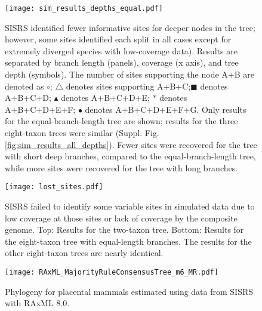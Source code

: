\documentclass[11pt, oneside]{article}   	%
\begin{document}
\begin{figure}[!ht]
\texttt{[image: sim\_results\_depths\_equal.pdf]}
\caption{SISRS identified fewer informative sites for deeper nodes in the tree; however, some sites identified each split in all cases except for extremely diverged species with low-coverage data). 
Results are separated by branch length (panels), coverage (x axis), and tree depth (symbols). 
The number of sites supporting the node A+B are denoted as $\circ$; $\triangle$ denotes sites supporting A+B+C;$\blacksquare$ denotes A+B+C+D; $\blacktriangle$ denotes A+B+C+D+E; $\ast$ denotes A+B+C+D+E+F; $\bullet$ denotes A+B+C+D+E+F+G.
Only results for the equal-branch-length tree are shown; results for the three eight-taxon trees were similar (Suppl. Fig. \ref{fig:sim_results_all_depths}).
Fewer sites were recovered for the tree with short deep branches, compared to the equal-branch-length tree, while more sites were recovered for the tree with long branches.}
\label{fig:simresults_depths}
\end{figure}


\begin{figure}[!ht]
\texttt{[image: lost\_sites.pdf]}
\caption{SISRS failed to identify some variable sites in simulated data due to low coverage at those sites or lack of coverage by the composite genome.
Top: Results for the two-taxon tree.
Bottom: Results for the eight-taxon tree with equal-length branches.
The results for the other eight-taxon trees are nearly identical.}
\label{fig:sims_falsenegs}
\end{figure}

\begin{figure}[!ht]
\texttt{[image: RAxML\_MajorityRuleConsensusTree\_m6\_MR.pdf]}
\caption{Phylogeny for placental mammals estimated using data from SISRS with RAxML 8.0.}
\label{fig:mammal_phyl}
\end{figure}

\end{document}
